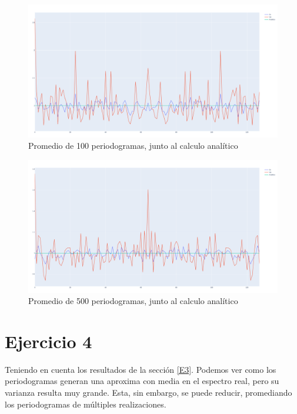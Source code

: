 \documentclass[12pt,letterpaper]{article}     %
\begin{document}
\begin{figure}[!ht]
\centering
\includegraphics[width=18cm]{imagenes/PromedioN100.png}
\caption{Promedio de 100 periodogramas, junto al calculo analítico}
\end{figure}

\begin{figure}[!ht]
\centering
\includegraphics[width=18cm]{imagenes/PromedioN500.png}
\caption{Promedio de 500 periodogramas, junto al calculo analítico}
\end{figure}

\clearpage
\section{Ejercicio 4}

Teniendo en cuenta los resultados de la sección
\ref{E3}.
Podemos ver como los periodogramas generan una 
aproxima con media en el espectro real, pero su
varianza resulta muy grande. Esta, sin embargo, 
se puede reducir, promediando los periodogramas
de múltiples realizaciones.
\end{document}

